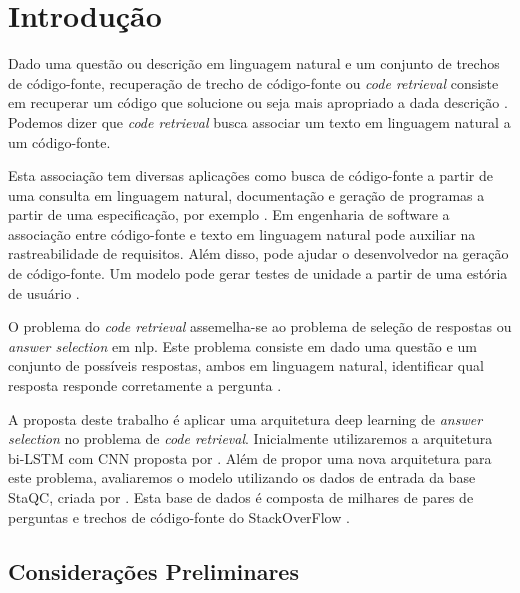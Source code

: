 \chapter{Introdução}
\label{cap:introducao}

Dado uma questão ou descrição em linguagem natural e um conjunto de trechos de código-fonte, recuperação de trecho de código-fonte ou \textit{code retrieval} consiste em recuperar um código que solucione ou seja mais apropriado a dada descrição \citep{Allamanis-bimodal-source-code-natural-language:2015}. Podemos dizer que \textit{code retrieval} busca associar um texto em linguagem natural a um código-fonte. 

Esta associação tem diversas aplicações como busca de código-fonte a partir de uma consulta em linguagem natural, documentação e geração de programas a partir de uma especificação, por exemplo \citep{Allamanis:2018:SML}. Em engenharia de software a associação entre código-fonte e texto em linguagem natural pode auxiliar na rastreabilidade de requisitos. Além disso, pode ajudar o desenvolvedor na geração de código-fonte. Um modelo pode gerar testes de unidade a partir de uma estória de usuário \citep{marcelo-vem-2019}.

O problema do \textit{code retrieval} assemelha-se ao problema de seleção de respostas ou \textit{answer selection} em \acrshort{nlp}. Este problema consiste em dado uma questão e um conjunto de possíveis respostas, ambos em linguagem natural, identificar qual resposta responde corretamente a pergunta \citep{lai-etal-2018-review}. 

A proposta deste trabalho é aplicar uma arquitetura deep learning de \textit{answer selection} no problema de \textit{code retrieval}. Inicialmente utilizaremos a arquitetura bi-LSTM com CNN proposta por \cite{tan-lstm-qa}. Além de propor uma nova arquitetura para este problema, avaliaremos o modelo utilizando os dados de entrada da base StaQC, criada por \cite{yao-2018}. Esta base de dados é composta de milhares de pares de perguntas e trechos de código-fonte do StackOverFlow \citep{marcelo-vem-2019}.



\section{Considerações Preliminares}
\label{sec:consideracoes_preliminares}

